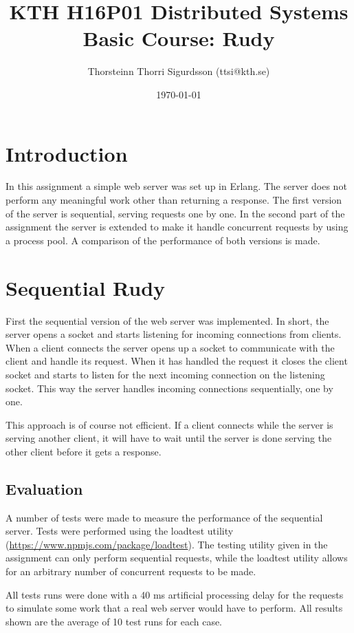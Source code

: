 \documentclass[a4paper, 11pt]{article}
\title{KTH H16P01 Distributed Systems Basic Course: Rudy}
\author{Thorsteinn Thorri Sigurdsson (ttsi@kth.se)}
\date{\today{}}
\begin{document}
\maketitle

\section{Introduction}

In this assignment a simple web server was set up in Erlang. The server does not perform any meaningful work other than returning a response. The first version of the server is sequential, serving requests one by one. In the second part of the assignment the server is extended to make it handle concurrent requests by using a process pool. A comparison of the performance of both versions is made.

\section{Sequential Rudy}

First the sequential version of the web server was implemented. In short, the server opens a socket and starts listening for incoming connections from clients. When a client connects the server opens up a socket to communicate with the client and handle its request. When it has handled the request it closes the client socket and starts to listen for the next incoming connection on the listening socket. This way the server handles incoming connections sequentially, one by one.

This approach is of course not efficient. If a client connects while the server is serving another client, it will have to wait until the server is done serving the other client before it gets a response. 

\subsection{Evaluation}

A number of tests were made to measure the performance of the sequential server. Tests were performed using the loadtest utility (\url{https://www.npmjs.com/package/loadtest}). The testing utility given in the assignment can only perform sequential requests, while the loadtest utility allows for an arbitrary number of concurrent requests to be made.

All tests runs were done with a 40 ms artificial processing delay for the requests to simulate some work that a real web server would have to perform. All results shown are the average of 10 test runs for each case.
\end{document}
